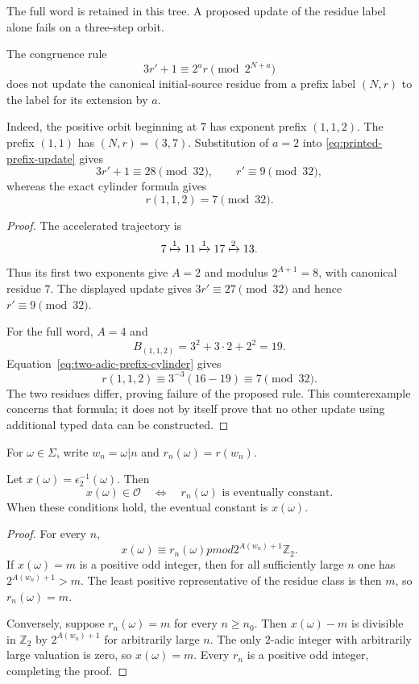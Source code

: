 The full word is retained in this tree.  A proposed update of the residue
label alone fails on a three-step orbit.

\begin{proposition}
\label{prop:printed-prefix-update-counterexample}
The congruence rule
\begin{equation}
\label{eq:printed-prefix-update}
 3r'+1\equiv2^a r\pmod{2^{N+a}}
\end{equation}
does not update the canonical initial-source residue from a prefix label
$(N,r)$ to the label for its extension by $a$.

Indeed, the positive orbit beginning at $7$ has exponent prefix $(1,1,2)$.
The prefix $(1,1)$ has $(N,r)=(3,7)$.  Substitution of $a=2$ into
\eqref{eq:printed-prefix-update} gives
\[
 3r'+1\equiv28\pmod{32},
 \qquad r'\equiv9\pmod{32},
\]
whereas the exact cylinder formula gives
\[
 r(1,1,2)=7\pmod{32}.
\]
\end{proposition}

\begin{proof}
The accelerated trajectory is
\[
 7\xmapsto{1}11\xmapsto{1}17\xmapsto{2}13.
\]
Thus its first two exponents give $A=2$ and modulus $2^{A+1}=8$, with
canonical residue $7$.  The displayed update gives
$3r'\equiv27\pmod{32}$ and hence $r'\equiv9\pmod{32}$.

For the full word, $A=4$ and
\[
 B_{(1,1,2)}=3^2+3\cdot2+2^2=19.
\]
Equation~\eqref{eq:two-adic-prefix-cylinder} gives
\[
 r(1,1,2)\equiv3^{-3}(16-19)\equiv7\pmod{32}.
\]
The two residues differ, proving failure of the proposed rule.  This
counterexample concerns that formula; it does not by itself prove that no
other update using additional typed data can be constructed.
\end{proof}

For $\omega\in\Sigma$, write $w_n=\omega|n$ and
$r_n(\omega)=r(w_n)$.

\begin{theorem}
\label{thm:positive-itinerary-stabilization}
Let $x(\omega)=\epsilon_2^{-1}(\omega)$.  Then
\[
 x(\omega)\in\mathcal O
 \quad\Longleftrightarrow\quad
 r_n(\omega)\text{ is eventually constant}.
\]
When these conditions hold, the eventual constant is $x(\omega)$.
\end{theorem}

\begin{proof}
For every $n$,
\[
 x(\omega)\equiv r_n(\omega)pmod{2^{A(w_n)+1}\mathbb Z_2}.
\]
If $x(\omega)=m$ is a positive odd integer, then for all sufficiently large
$n$ one has $2^{A(w_n)+1}>m$.  The least positive representative of the
residue class is then $m$, so $r_n(\omega)=m$.

Conversely, suppose $r_n(\omega)=m$ for every $n\geq n_0$.  Then
$x(\omega)-m$ is divisible in $\mathbb Z_2$ by
$2^{A(w_n)+1}$ for arbitrarily large $n$.  The only $2$-adic integer with
arbitrarily large valuation is zero, so $x(\omega)=m$.  Every $r_n$ is a
positive odd integer, completing the proof.
\end{proof}


